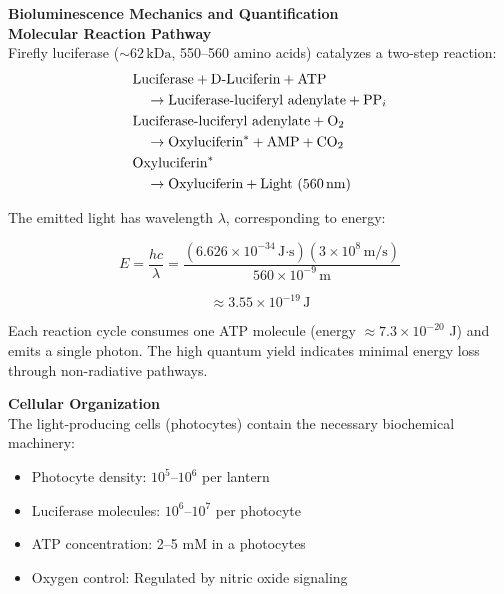 \begin{technical}
{\Large\textbf{Bioluminescence Mechanics and Quantification}}\\[0.2em]

\noindent\textbf{Molecular Reaction Pathway}\\
Firefly luciferase ($\sim 62\,\text{kDa}$, 550–560 amino acids) catalyzes a two-step reaction:
\begin{align}
&\text{Luciferase} + \text{D-Luciferin} + \text{ATP} \notag\\
&\quad\rightarrow \text{Luciferase-luciferyl adenylate} + \text{PP}_i \notag\\
&\text{Luciferase-luciferyl adenylate} + \text{O}_2 \notag\\
&\quad\rightarrow \text{Oxyluciferin}^* + \text{AMP} + \text{CO}_2 \notag\\
&\text{Oxyluciferin}^* \notag\\
&\quad\rightarrow \text{Oxyluciferin} + \text{Light (560\,nm)}
\end{align}

The emitted light has wavelength $\lambda$, corresponding to energy:

\begin{equation}
E = \frac{hc}{\lambda} = 
\frac{(6.626 \times 10^{-34}\,\text{J·s}) (3 \times 10^8\,\text{m/s})}
{560 \times 10^{-9}\,\text{m}} 
\end{equation}

\begin{equation}
\approx 3.55 \times 10^{-19}\,\text{J}
\end{equation}

Each reaction cycle consumes one ATP molecule (energy $\approx 7.3 \times 10^{-20}$ J) and emits a single photon. The high quantum yield indicates minimal energy loss through non-radiative pathways.

\noindent\textbf{Cellular Organization}\\
The light-producing cells (photocytes) contain the necessary biochemical machinery:

\begin{itemize}[leftmargin=*,topsep=0pt,itemsep=0pt]
    \item Photocyte density: $10^5$–$10^6$ per lantern
    \item Luciferase molecules: $10^6$–$10^7$ per photocyte
    \item ATP concentration: 2–5 mM in a photocytes
    \item Oxygen control: Regulated by nitric oxide signaling
\end{itemize}


\end{technical}
